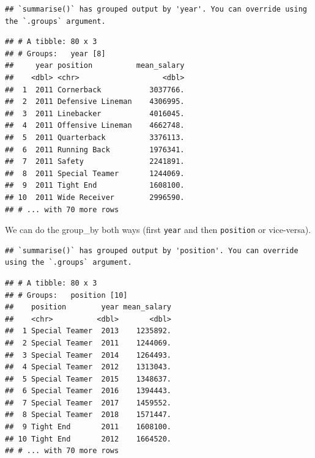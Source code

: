 \documentclass[
]{book}
\newenvironment{Shaded}{\begin{snugshade}}{\end{snugshade}}
\newcommand{\DataTypeTok}[1]{\textcolor[rgb]{0.13,0.29,0.53}{#1}}
\newcommand{\KeywordTok}[1]{\textcolor[rgb]{0.13,0.29,0.53}{\textbf{#1}}}
\newcommand{\NormalTok}[1]{#1}
\newcommand{\OperatorTok}[1]{\textcolor[rgb]{0.81,0.36,0.00}{\textbf{#1}}}
\newcommand{\StringTok}[1]{\textcolor[rgb]{0.31,0.60,0.02}{#1}}
\begin{document}
\begin{Shaded}
\end{Shaded}

\begin{verbatim}
## `summarise()` has grouped output by 'year'. You can override using the `.groups` argument.
\end{verbatim}

\begin{verbatim}
## # A tibble: 80 x 3
## # Groups:   year [8]
##     year position          mean_salary
##    <dbl> <chr>                   <dbl>
##  1  2011 Cornerback           3037766.
##  2  2011 Defensive Lineman    4306995.
##  3  2011 Linebacker           4016045.
##  4  2011 Offensive Lineman    4662748.
##  5  2011 Quarterback          3376113.
##  6  2011 Running Back         1976341.
##  7  2011 Safety               2241891.
##  8  2011 Special Teamer       1244069.
##  9  2011 Tight End            1608100.
## 10  2011 Wide Receiver        2996590.
## # ... with 70 more rows
\end{verbatim}

We can do the group\_by both ways (first \texttt{year} and then \texttt{position} or vice-versa).

\begin{Shaded}
\end{Shaded}

\begin{verbatim}
## `summarise()` has grouped output by 'position'. You can override using the `.groups` argument.
\end{verbatim}

\begin{verbatim}
## # A tibble: 80 x 3
## # Groups:   position [10]
##    position        year mean_salary
##    <chr>          <dbl>       <dbl>
##  1 Special Teamer  2013    1235892.
##  2 Special Teamer  2011    1244069.
##  3 Special Teamer  2014    1264493.
##  4 Special Teamer  2012    1313043.
##  5 Special Teamer  2015    1348637.
##  6 Special Teamer  2016    1394443.
##  7 Special Teamer  2017    1459552.
##  8 Special Teamer  2018    1571447.
##  9 Tight End       2011    1608100.
## 10 Tight End       2012    1664520.
## # ... with 70 more rows
\end{verbatim}
\end{document}
